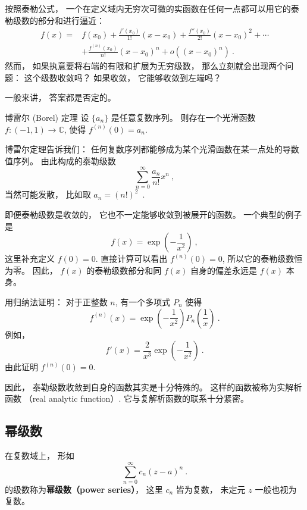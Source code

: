 


按照泰勒公式， 一个在定义域内无穷次可微的实函数在任何一点都可以用它的泰勒级数的部分和进行逼近：
$$
\begin{aligned}
f(x)=&f(x_0)+\frac{f'(x_0)}{1!}(x-x_0)+\frac{f''(x_0)}{2!}(x-x_0)^2+\cdots\\
&+\frac{f^{(n)}(x_0)}{n!}(x-x_0)^n+o((x-x_0)^n)~.
\end{aligned}
$$
然而， 如果执意要将右端的有限和扩展为无穷级数， 那么立刻就会出现两个问题： 这个级数收敛吗？ 如果收敛， 它能够收敛到左端吗？

一般来讲， 答案都是否定的。 

\begin{theorem}{博雷尔 (Borel) 定理}
设 $\{a_n\}$ 是任意复数序列。 则存在一个光滑函数 $f:(-1,1)\to\mathbb{C}$, 使得 $f^{(n)}(0)=a_n$.
\end{theorem}
博雷尔定理告诉我们： 任何复数序列都能够成为某个光滑函数在某一点处的导数值序列。 由此构成的泰勒级数
$$
\sum_{n=0}^\infty\frac{a_n}{n!}x^n~,
$$
当然可能发散， 比如取 $a_n=(n!)^2$~.

即便泰勒级数是收敛的， 它也不一定能够收敛到被展开的函数。 一个典型的例子是
$$
f(x)=\exp\left(-\frac{1}{x^2}\right)~,
$$
这里补充定义 $f(0)=0$. 直接计算可以看出 $f^{(n)}(0)=0$, 所以它的泰勒级数恒为零。 因此， $f(x)$ 的泰勒级数部分和同 $f(x)$ 自身的偏差永远是 $f(x)$ 本身。

\begin{exercise}{}
用归纳法证明： 对于正整数 $n$, 有一个多项式 $P_n$ 使得
$$
f^{(n)}(x)=\exp\left(-\frac{1}{x^2}\right)P_n\left(\frac{1}{x}\right)~.
$$
例如， 
$$
f'(x)=\frac{2}{x^3}\exp\left(-\frac{1}{x^2}\right)~.
$$
由此证明 $f^{(n)}(0)=0$.
\end{exercise}

因此， 泰勒级数收敛到自身的函数其实是十分特殊的。 这样的函数被称为实解析函数 （real analytic function）. 它与复解析函数的联系十分紧密。

\subsection{幂级数}
在复数域上， 形如
\begin{equation}
\sum_{n=0}^\infty c_n(z-a)^n~.
\end{equation}
的级数称为\textbf{幂级数（power series）}， 这里 $c_n$ 皆为复数， 未定元 $z$ 一般也视为复数。 

